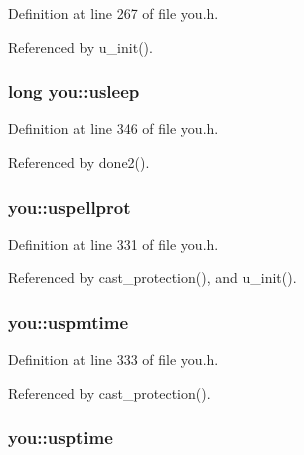 Definition at line 267 of file you.\+h.



Referenced by u\+\_\+init().

\hypertarget{structyou_a66ad1d014c330de174c200ca40b701d5}{
\subsubsection[{usleep}]{\setlength{\rightskip}{0pt plus 5cm}long you\+::usleep}}\label{structyou_a66ad1d014c330de174c200ca40b701d5}


Definition at line 346 of file you.\+h.



Referenced by done2().

\hypertarget{structyou_acc356d1f0009d4486e5cc977be49fd35}{
\subsubsection[{uspellprot}]{ you\+::uspellprot}}\label{structyou_acc356d1f0009d4486e5cc977be49fd35}


Definition at line 331 of file you.\+h.



Referenced by cast\+\_\+protection(), and u\+\_\+init().

\hypertarget{structyou_a7bc0458d075e246d875f8d3d59dcdf98}{
\subsubsection[{uspmtime}]{ you\+::uspmtime}}\label{structyou_a7bc0458d075e246d875f8d3d59dcdf98}


Definition at line 333 of file you.\+h.



Referenced by cast\+\_\+protection().

\hypertarget{structyou_a74dd5c0738d963691257cae4842927f0}{
\subsubsection[{usptime}]{ you\+::usptime}}\label{structyou_a74dd5c0738d963691257cae4842927f0}


